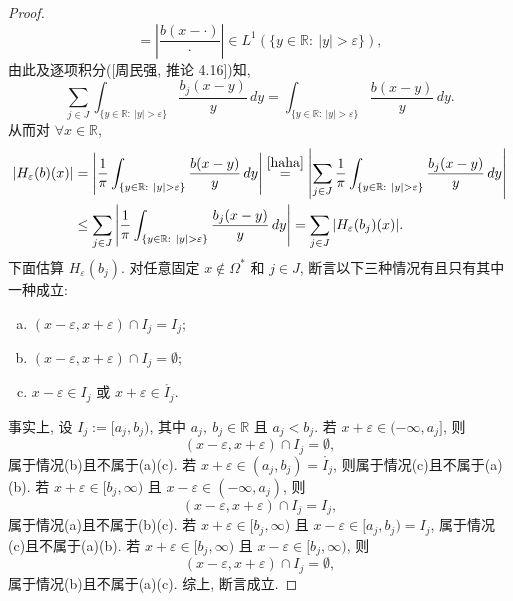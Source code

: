 \documentclass[a4paper,11pt]{article}
\theoremstyle{definition}
\begin{document}
\begin{proof}
$$            = \left| \frac{b(x - \cdot)}{\cdot} \right| 
            \in L^1(\{y \in \mathbb{R} :\ |y| > \varepsilon\}),
    $$
    由此及逐项积分([周民强, 推论 4.16])知,
    \begin{equation} \label{haha}
        \sum_{j \in J} \int_{\{y \in \mathbb{R} :\ |y| > \varepsilon\}} \frac{b_j(x - y)}{y} \, dy
            = \int_{\{y \in \mathbb{R} :\ |y| > \varepsilon\}} \frac{b(x - y)}{y} \, dy.
    \end{equation}
    从而对 $ \forall x \in \mathbb{R} $,
    \begin{align} \label{add1}
        |H_\varepsilon (b)(x)| 
            &= \left| \frac{1}{\pi} \int_{\{y \in \mathbb{R} :\ |y| > \varepsilon\}} \frac{b(x - y)}{y} \, dy \right| 
            \overset{\eqref{haha}}{=} \left| \sum_{j \in J} \frac{1}{\pi} \int_{\{y \in \mathbb{R} :\ |y| > \varepsilon\}}  
                \frac{b_j(x - y)}{y} \, dy \right|  \\
            &\leq \sum_{j \in J} \left| \frac{1}{\pi} \int_{\{y \in \mathbb{R} :\ |y| > \varepsilon\}}  
                \frac{b_j(x - y)}{y} \, dy \right| \notag 
            = \sum_{j \in J} |H_\varepsilon (b_j)(x)|. \notag
    \end{align}
    下面估算 $ H_\varepsilon (b_j) $. 对任意固定 $ x \notin \Omega^* $ 和 $ j \in J $,
    断言以下三种情况有且只有其中一种成立:
    \begin{enumerate}[(a)]
      \item $ (x - \varepsilon, x + \varepsilon) \cap I_j = I_j $;
      \item $ (x - \varepsilon, x + \varepsilon) \cap I_j = \emptyset $;
      \item $ x - \varepsilon \in I_j $ 或 $ x + \varepsilon \in \mathring{I_j} $.
    \end{enumerate}
    事实上, 设 $ I_j := [a_j, b_j) $, 其中 $ a_j,\ b_j \in \mathbb{R} $ 且 $ a_j < b_j $.
    若 $ x + \varepsilon \in (-\infty, a_j] $, 则 
    $$
        (x - \varepsilon, x + \varepsilon) \cap I_j = \emptyset,
    $$
    属于情况(b)且不属于(a)(c). 
    若 $ x + \varepsilon \in (a_j, b_j) = \mathring{I_j} $, 则属于情况(c)且不属于(a)(b).
    若 $ x + \varepsilon \in [b_j, \infty) $ 且 $ x - \varepsilon \in (-\infty, a_j) $, 则
    $$
        (x - \varepsilon, x + \varepsilon) \cap I_j = I_j,
    $$
    属于情况(a)且不属于(b)(c). 
    若 $ x + \varepsilon \in [b_j, \infty) $ 且 $ x - \varepsilon \in [a_j, b_j) = I_j $, 
    属于情况(c)且不属于(a)(b).
    若 $ x + \varepsilon \in [b_j, \infty) $ 且 $ x - \varepsilon \in [b_j, \infty) $, 则
    $$
        (x - \varepsilon, x + \varepsilon) \cap I_j = \emptyset,
    $$
    属于情况(b)且不属于(a)(c). 综上, 断言成立.
    

\end{proof}
\end{document}
